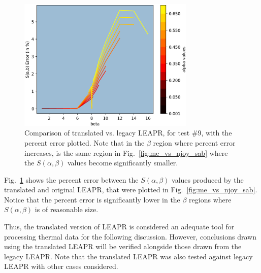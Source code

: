 \documentclass[Master.tex]{subfiles}
\begin{document}
    \begin{figure}[H]
      \begin{center}
        \includegraphics[width=0.75\textwidth]{images/me-vs-njoy-3b}
        \caption[Comparison of Translated vs. Legacy LEAPR, for Test \#9 (\% Error) ]{Comparison of translated vs. legacy LEAPR, for test \#9, with the percent error plotted. Note that in the $\beta$ region where percent error increases, is the same region in Fig.~\ref{fig:me_vs_njoy_sab} where the $S(\alpha,\beta)$ values become significantly smaller.}
        \label{fig:me_vs_njoy_error}
      \end{center}
    \end{figure}

    Fig.~\ref{fig:me_vs_njoy_error} shows the percent error between the $S(\alpha,\beta)$ values produced by the translated and original LEAPR, that were plotted in Fig.~\ref{fig:me_vs_njoy_sab}.  Notice that the percent error is significantly lower in the $\beta$ regions where $S(\alpha,\beta)$ is of reasonable size. 

    Thus, the translated version of LEAPR is considered an adequate tool for processing thermal data for the following discussion. However, conclusions drawn using the translated LEAPR will be verified alongside those drawn from the legacy LEAPR. Note that the translated LEAPR was also tested against legacy LEAPR with other cases considered.
\end{document}
